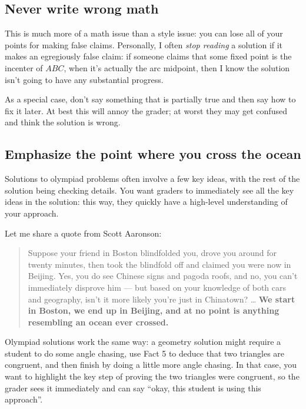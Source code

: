 \documentclass[11pt]{scrartcl}
\begin{document}
\subsection{Never write wrong math}
This is much more of a math issue than a style issue:
you can lose all of your points for making false claims.
Personally, I often \emph{stop reading} a solution if it makes
an egregiously false claim: if someone claims that some fixed
point is the incenter of $ABC$,
when it's actually the arc midpoint,
then I know the solution isn't going to have any substantial progress.

As a special case, don't say something that is partially true
and then say how to fix it later.
At best this will annoy the grader;
at worst they may get confused and think the solution is wrong.

\subsection{Emphasize the point where you cross the ocean}
Solutions to olympiad problems often involve a few key ideas,
with the rest of the solution being checking details.
You want graders to immediately see all the key ideas in the solution:
this way, they quickly have a high-level understanding of your approach.

Let me share a quote from Scott Aaronson:
\begin{quote}
	Suppose your friend in Boston blindfolded you,
	drove you around for twenty minutes,
	then took the blindfold off and claimed you were now in Beijing.
	Yes, you do see Chinese signs and pagoda roofs,
	and no, you can't immediately disprove him ---
	but based on your knowledge of both cars and geography,
	isn't it more likely you're just in Chinatown?
	\dots
	\textbf{We start in Boston, we end up in Beijing,
	and at no point is anything resembling an ocean ever crossed.}
\end{quote}
Olympiad solutions work the same way:
a geometry solution might require a student to do some angle chasing,
use Fact 5 to deduce that two triangles are congruent,
and then finish by doing a little more angle chasing.
In that case, you want to highlight the key step of proving the two triangles
were congruent, so the grader sees it immediately and can say
``okay, this student is using this approach''.
\end{document}
